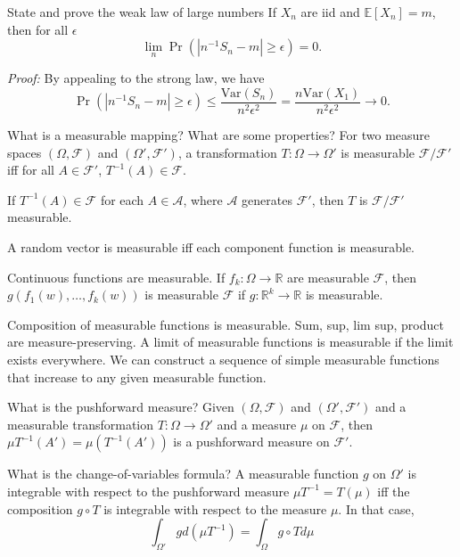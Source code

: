 \documentclass[avery5388,grid,frame]{flashcards}
\newcommand{\R}{\mathbb{R}}
\newcommand{\E}{\mathbb{E}}
\newcommand{\Var}{\text{Var}}
\newcommand{\F}{\mathcal F}
\begin{document}
\begin{flashcard}
    {State and prove the weak law of large numbers}
    If $X_n$ are iid and $\E[X_n] = m$, then for all $\epsilon$
    $$\lim_n \Pr(| n^{-1} S_n - m| \geq \epsilon) = 0.$$

    \emph{Proof:} By appealing to the strong law, we have
    $$\Pr(| n^{-1} S_n - m| \geq \epsilon) \leq \frac{\Var(S_n)}{n^2 \epsilon^2} = \frac{n \Var(X_1)}{n^2 \epsilon^2} \rightarrow 0.$$
\end{flashcard}


\begin{flashcard}
    {What is a measurable mapping? What are some properties?}
    For two measure spaces $(\Omega, \F)$ and $(\Omega', \F')$, a transformation $T: \Omega \rightarrow \Omega'$ is measurable $\F / \F'$ iff for all $A \in \F'$, $T^{-1}(A) \in \F$.

    If $T^{-1}(A) \in \F$ for each $A \in \mathcal A$, where $\mathcal A$ generates $\F'$, then $T$ is $\F / \F'$ measurable.

    A random vector is measurable iff each component function is measurable.

    Continuous functions are measurable. If $f_k: \Omega \rightarrow \R$ are measurable $\F$, then $g(f_1(w),\dots,f_k(w))$ is measurable $\F$ if $g: \R^k \rightarrow \R$ is measurable.

    Composition of measurable functions is measurable. Sum, sup, lim sup, product are measure-preserving. A limit of measurable functions is measurable if the limit exists everywhere. We can construct a sequence of simple measurable functions that increase to any given measurable function.
\end{flashcard}


\begin{flashcard}
    {What is the pushforward measure?}
    Given $(\Omega, \F)$ and $(\Omega',\F')$ and a measurable transformation $T:\Omega \rightarrow \Omega'$ and a measure $\mu$ on $\F$, then $\mu T^{-1}(A') = \mu (T^{-1}(A'))$ is a pushforward measure on $\F'$.
\end{flashcard}


\begin{flashcard}
    {What is the change-of-variables formula?}
    A measurable function $g$ on $\Omega'$ is integrable with respect to the pushforward measure $\mu T^{-1} = T(\mu)$ iff the composition $g \circ T$ is integrable with respect to the measure $\mu$. In that case,
    $$\int_{\Omega'} g d(\mu T^{-1}) = \int_{\Omega} g \circ T d\mu$$
\end{flashcard}
\end{document}

